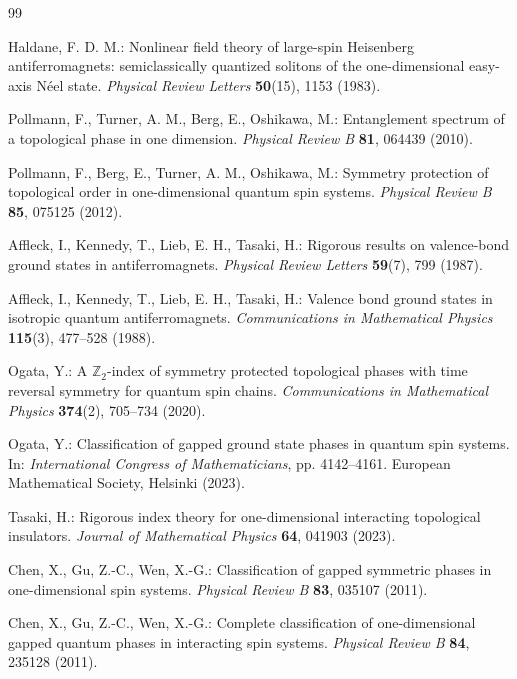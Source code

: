\documentclass[12pt,a4paper]{article}
\begin{document}
 
 \begin{thebibliography}{99}


Haldane, F. D. M.:
Nonlinear field theory of large-spin Heisenberg antiferromagnets:
semiclassically quantized solitons of the one-dimensional easy-axis Néel state.
\textit{Physical Review Letters} \textbf{50}(15), 1153 (1983).

Pollmann, F., Turner, A. M., Berg, E., Oshikawa, M.:
Entanglement spectrum of a topological phase in one dimension.
\textit{Physical Review B} \textbf{81}, 064439 (2010).

Pollmann, F., Berg, E., Turner, A. M., Oshikawa, M.:
Symmetry protection of topological order in one-dimensional quantum spin systems.
\textit{Physical Review B} \textbf{85}, 075125 (2012).

Affleck, I., Kennedy, T., Lieb, E. H., Tasaki, H.:
Rigorous results on valence-bond ground states in antiferromagnets.
\textit{Physical Review Letters} \textbf{59}(7), 799 (1987).

Affleck, I., Kennedy, T., Lieb, E. H., Tasaki, H.:
Valence bond ground states in isotropic quantum antiferromagnets.
\textit{Communications in Mathematical Physics} \textbf{115}(3), 477–528 (1988).

Ogata, Y.:
A $\mathbb{Z}_2$-index of symmetry protected topological phases with time reversal symmetry for quantum spin chains.
\textit{Communications in Mathematical Physics} \textbf{374}(2), 705–734 (2020).

Ogata, Y.:
Classification of gapped ground state phases in quantum spin systems.
In: \textit{International Congress of Mathematicians}, pp. 4142–4161.
European Mathematical Society, Helsinki (2023).

Tasaki, H.:
Rigorous index theory for one-dimensional interacting topological insulators.
\textit{Journal of Mathematical Physics} \textbf{64}, 041903 (2023).

Chen, X., Gu, Z.-C., Wen, X.-G.:
Classification of gapped symmetric phases in one-dimensional spin systems.
\textit{Physical Review B} \textbf{83}, 035107 (2011).

Chen, X., Gu, Z.-C., Wen, X.-G.:
Complete classification of one-dimensional gapped quantum phases in interacting spin systems.
\textit{Physical Review B} \textbf{84}, 235128 (2011).


\end{thebibliography}
\end{document}

